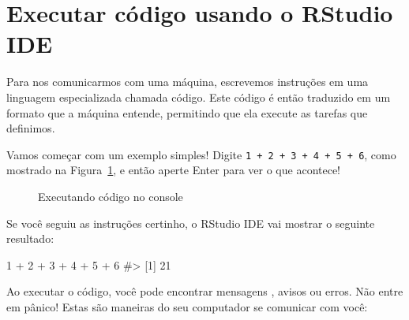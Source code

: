 \documentclass[
  letterpaper,
]{book}
\newenvironment{Shaded}{\begin{snugshade}}{\end{snugshade}}
\newcommand{\CommentTok}[1]{\textcolor[rgb]{0.37,0.37,0.37}{#1}}
\newcommand{\DecValTok}[1]{\textcolor[rgb]{0.68,0.00,0.00}{#1}}
\newcommand{\SpecialCharTok}[1]{\textcolor[rgb]{0.37,0.37,0.37}{#1}}
\theoremstyle{definition}
\theoremstyle{plain}
\theoremstyle{remark}
\begin{document}
\section{Executar código usando o RStudio
IDE}\label{executar-cuxf3digo-usando-o-rstudio-ide}

Para nos comunicarmos com uma máquina, escrevemos instruções em uma
linguagem especializada chamada código. Este código é então traduzido em
um formato que a máquina entende, permitindo que ela execute as tarefas
que definimos.

Vamos começar com um exemplo simples! Digite
\texttt{1\ +\ 2\ +\ 3\ +\ 4\ +\ 5\ +\ 6}, como mostrado na
Figura~\ref{fig-executing-code-example}, e então aperte Enter para ver o
que acontece!

\begin{figure}


\caption{\label{fig-executing-code-example}Executando código no console}

\end{figure}%

Se você seguiu as instruções certinho, o RStudio IDE vai mostrar o
seguinte resultado:

\begin{Shaded}
\begin{Highlighting}[]
\DecValTok{1} \SpecialCharTok{+} \DecValTok{2} \SpecialCharTok{+} \DecValTok{3} \SpecialCharTok{+} \DecValTok{4} \SpecialCharTok{+} \DecValTok{5} \SpecialCharTok{+} \DecValTok{6}
\CommentTok{\#\textgreater{} [1] 21}
\end{Highlighting}
\end{Shaded}

Ao executar o código, você pode encontrar mensagens , avisos ou erros.
Não entre em pânico! Estas são maneiras do seu computador se comunicar
com você:
\end{document}

